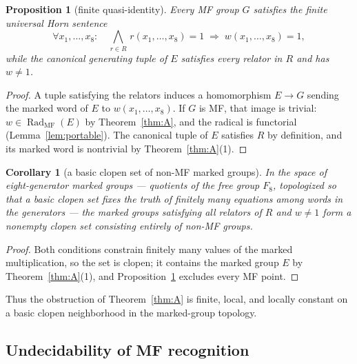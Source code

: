 \documentclass[11pt]{amsart}
\newcommand{\leanverified}[2]{\ignorespaces}
\newtheorem{proposition}[theorem]{Proposition}
\newtheorem{corollary}[theorem]{Corollary}
\theoremstyle{definition}
\theoremstyle{remark}
\theoremstyle{plain}
\begin{document}
\begin{proposition}[finite quasi-identity]\label{prop:horn}
Every MF group $G$ satisfies the finite universal Horn sentence
\[
 \forall x_1,\dots,x_8\colon\quad
 \bigwedge_{r\in R}\,r(x_1,\dots,x_8)=1
 \;\Longrightarrow\; w(x_1,\dots,x_8)=1 ,
\]
while the canonical generating tuple of $E$ satisfies every relator in $R$
and has $w\ne1$.
\leanverified{Sofic/LiteralUniversalHorn}{GroupApproximation.LiteralUniversalHorn.manuscriptLiteralUniversalHorn}
\end{proposition}

\begin{proof}
A tuple satisfying the relators induces a homomorphism $E\to G$ sending
the marked word of $E$ to $w(x_1,\dots,x_8)$.  If $G$ is MF, that image
is trivial: $w\in\operatorname{Rad}_{\mathrm{MF}}(E)$ by
Theorem~\ref{thm:A}, and the radical is functorial
(Lemma~\ref{lem:portable}).
The canonical tuple of $E$ satisfies $R$ by definition, and its marked
word is nontrivial by Theorem~\ref{thm:A}(1).
\end{proof}

\begin{corollary}[a basic clopen set of non-MF marked groups]\label{cor:cylinder}
In the space of eight-generator marked groups --- quotients of the free
group $F_8$, topologized so that a basic clopen set fixes the truth of
finitely many equations among words in the generators --- the marked groups
satisfying all relators of $R$ and $w\ne1$ form a nonempty clopen set
consisting entirely of non-MF groups.
\leanverified{Sofic/LiteralMarkedCylinder}{GroupApproximation.LiteralMarkedCylinder.literal_nonempty_clopen_nonMF_cylinder}
\end{corollary}

\begin{proof}
Both conditions constrain finitely many values of the marked
multiplication, so the set is clopen; it contains the marked group $E$ by
Theorem~\ref{thm:A}(1), and Proposition~\ref{prop:horn} excludes every MF
point.
\end{proof}

Thus the obstruction of Theorem~\ref{thm:A} is finite, local, and
locally constant on a basic clopen neighborhood in the marked-group
topology.

\subsection{Undecidability of MF recognition}
\end{document}
